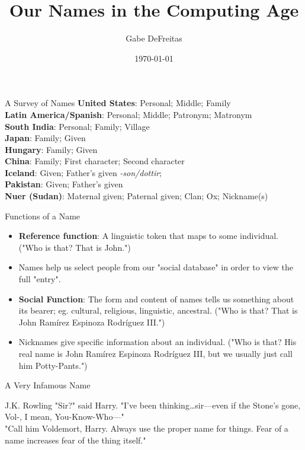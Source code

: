 \documentclass{beamer}
\title{Our Names in the Computing Age}
\date{\today}
\author{Gabe DeFreitas}
\begin{document}
\maketitle

\begin{frame}{A Survey of Names}
\textbf{United States}: Personal; Middle; Family \\
\textbf{Latin America/Spanish}: Personal; Middle; Patronym; Matronym \\
\textbf{South India}: Personal; Family; Village \parencite{finch08} \\
\textbf{Japan}: Family; Given \\
\textbf{Hungary}: Family; Given \\
\textbf{China}: Family; First character; Second character \parencite{louie06}\\
\textbf{Iceland}: Given; Father's given \textit{-son/dottir}; \\
\textbf{Pakistan}: Given; Father's given \\
\textbf{Nuer (Sudan)}: Maternal given; Paternal given; Clan; Ox; Nickname(s)
\parencite{wardhaugh92} \\
\end{frame}

\begin{frame}{Functions of a Name}
\begin{itemize}
\item \textbf{Reference function}: A linguistic token that maps to some
individual. ("Who is that? That is John.")
\item Names help us select people from our "social database" in order to view
the full "entry".
\item \textbf{Social Function}: The form and content of names tells us something
about its bearer; eg. cultural, religious, linguistic, ancestral. ("Who is that?
That is John Ramírez Espinoza Rodríguez III.")
\item Nicknames give specific information about an individual. ("Who is that?
His real name is John Ramírez Espinoza Rodríguez III, but we usually just call
him Potty-Pants.")
\end{itemize}
\end{frame}

\begin{frame}{A Very Infamous Name}
\begin{aquote}{J.K. Rowling}
"Sir?" said Harry. "I've been thinking…sir—even if the Stone’s gone, Vol-, I
mean, You-Know-Who—" \\ "Call him Voldemort, Harry. Always use the proper name for
things. Fear of a name increases fear of the thing itself."
\end{aquote}
\end{frame}
\end{document}
